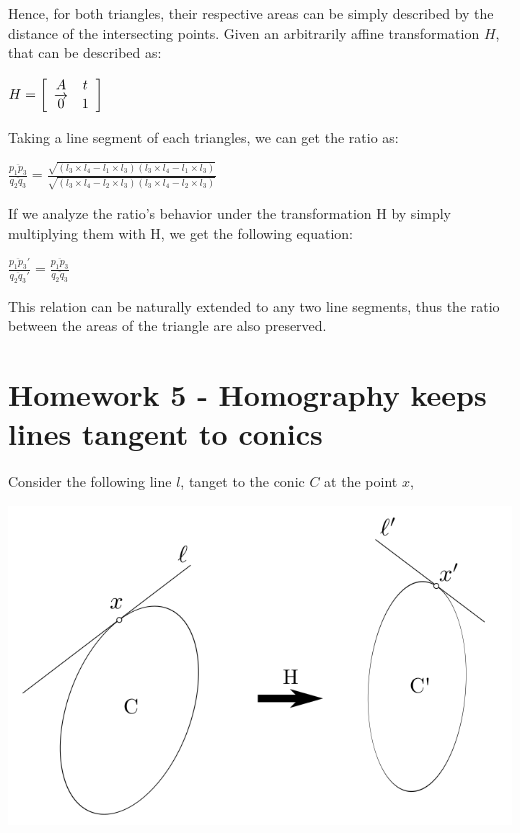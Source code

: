 \documentclass[]{article}
\begin{document}
Hence, for both triangles, their respective areas can be simply described by the distance of the intersecting points. Given an arbitrarily affine transformation $H$, that can be described as:



\centerline{ $H = \left[ {\begin{array}{*{20}c}
		A & t \\
		\overrightarrow{0} & 1   
		\end{array} } \right]$ }

Taking a line segment of each triangles, we can get the ratio as:

\centerline {
	$\frac{\overline{p_1p_3}}{\overline{q_2q_3}} = \frac{\sqrt{(l_3 \times l_4 - l_1 \times l_3)(l_3 \times l_4 - l_1 \times l_3)}}{\sqrt{(l_3 \times l_4 - l_2 \times l_3)(l_3 \times l_4 - l_2 \times l_3)}}$
}

If we analyze the ratio's behavior under the transformation H by simply multiplying them with H, we get the following equation: 

\centerline {
	$\frac{\overline{p_1p_3}'}{\overline{q_2q_3}'} = \frac{\overline{p_1p_3}}{\overline{q_2q_3}}$
}

This relation can be naturally extended to any two line segments, thus the ratio between the areas of the triangle are also preserved. 


\section{Homework 5 - Homography keeps lines tangent to conics}
Consider the following line $l$, tanget to the conic $C$ at the point $x$, 

\centerline {
	\includegraphics[scale=0.5]{scr3}
}
\end{document}
